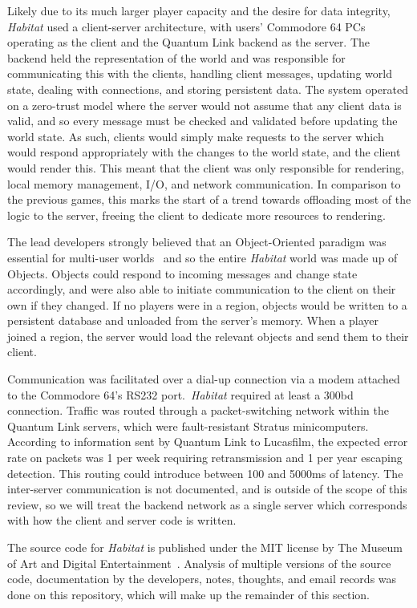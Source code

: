 Likely due to its much larger player capacity and the desire for data integrity, \textit{Habitat} used a client-server architecture, with users' Commodore 64 PCs operating as the client and the Quantum Link backend as the server. The backend held the representation of the world and was responsible for communicating this with the clients, handling client messages, updating world state, dealing with connections, and storing persistent data. The system operated on a zero-trust model where the server would not assume that any client data is valid, and so every message must be checked and validated before updating the world state. As such, clients would simply make requests to the server which would respond appropriately with the changes to the world state, and the client would render this. This meant that the client was only responsible for rendering, local memory management, I/O, and network communication. In comparison to the previous games, this marks the start of a trend towards offloading most of the logic to the server, freeing the client to dedicate more resources to rendering.

The lead developers strongly believed that an Object-Oriented paradigm was essential for multi-user worlds~\cite{morningstar} and so the entire \textit{Habitat} world was made up of Objects. Objects could respond to incoming messages and change state accordingly, and were also able to initiate communication to the client on their own if they changed. If no players were in a region, objects would be written to a persistent database and unloaded from the server's memory. When a player joined a region, the server would load the relevant objects and send them to their client.

Communication was facilitated over a dial-up connection via a modem attached to the Commodore 64's RS232 port.\ \textit{Habitat} required at least a 300bd connection. Traffic was routed through a packet-switching network within the Quantum Link servers, which were fault-resistant Stratus minicomputers. According to information sent by Quantum Link to Lucasfilm, the expected error rate on packets was 1 per week requiring retransmission and 1 per year escaping detection\cite{habitatsrc}. This routing could introduce between 100 and 5000ms of latency. The inter-server communication is not documented, and is outside of the scope of this review, so we will treat the backend network as a single server which corresponds with how the client and server code is written.

The source code for \textit{Habitat} is published under the MIT license by The Museum of Art and Digital Entertainment~\cite{habitatsrc}. Analysis of multiple versions of the source code, documentation by the developers, notes, thoughts, and email records was done on this repository, which will make up the remainder of this section.

